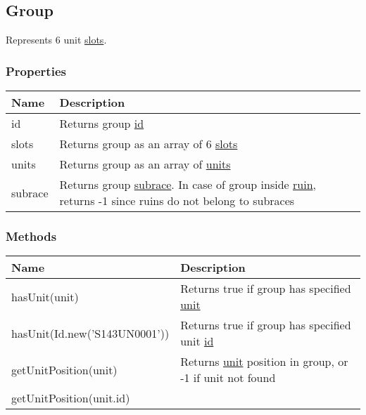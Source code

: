 \subsection{Group}
\label{Group}
Represents 6 unit \hyperref[UnitSlot]{slots}.
\subsubsection{Properties}
\begin{center}
\begin{tabularx}{\linewidth}{| l | X |}
\hline
\textbf{Name} & \textbf{Description} \\
\hline
id & Returns group \hyperref[Id]{id}\\
\hline
slots & Returns group as an array of 6 \hyperref[UnitSlot]{slots}\\
\hline
units & Returns group as an array of \hyperref[Unit]{units}\\
\hline
subrace & Returns group \hyperref[SubraceCategory]{subrace}. In case of group inside \hyperref[Ruin]{ruin}, returns -1 since ruins do not belong to subraces\\
\hline
\end{tabularx}
\end{center}

\subsubsection{Methods}
\begin{center}
\begin{tabularx}{\linewidth}{| l | X |}
\hline
\textbf{Name} & \textbf{Description} \\
\hline
hasUnit(unit) & Returns true if group has specified \hyperref[Unit]{unit}\\
\hline
hasUnit(Id.new('S143UN0001')) & Returns true if group has specified unit \hyperref[Id]{id}\\
\hline
getUnitPosition(unit) & Returns \hyperref[Unit]{unit} position in group, or -1 if unit not found\\
getUnitPosition(unit.id) &\\
\hline
\end{tabularx}
\end{center}